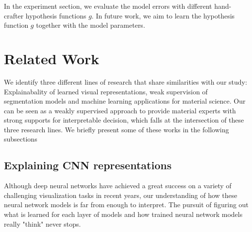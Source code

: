 \documentclass[10pt,twocolumn,letterpaper]{article}
\begin{document}
In the experiment section, we evaluate the model errors with different hand-crafter hypothesis functions $g$.
In future work, we aim to learn the hypothesis function $g$ together with the model parameters.


\section{Related Work}

We identify three different lines of research that share similarities with our study:
Explainabality of learned visual representations, 
weak supervision of segmentation models and 
machine learning applications for material science.
Our can be seen as a weakly supervised approach to provide material 
experts with strong supports for interpretable decision, 
which falls at the intersection of these three research lines.
We briefly present some of these works in the following subsections

\subsection{Explaining CNN representations}
Although deep neural networks have achieved a great success on a variety 
of challenging visualization tasks in recent years, 
our understanding of how these neural network models is far from enough to interpret.
The pursuit of figuring out what is learned for each layer of models 
and how trained neural network models really "think" never stops.
\end{document}
